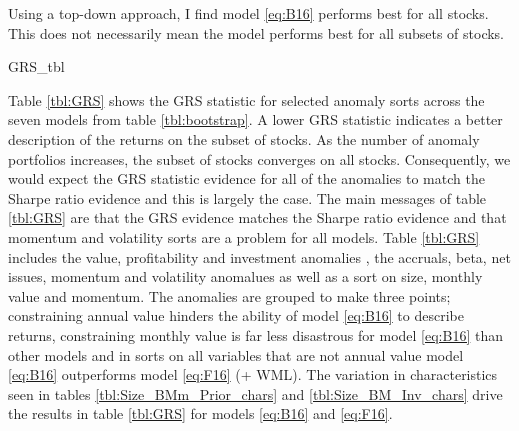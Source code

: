 
Using a top-down approach, I find model \ref{eq:B16} performs best for all
stocks.
This does not necessarily mean the model performs best for all subsets of
stocks.

{GRS_tbl}

Table \ref{tbl:GRS} shows the GRS statistic for selected anomaly sorts across
the seven models from table \ref{tbl:bootstrap}.
A lower GRS statistic indicates a better description of the returns on the
subset of stocks.
As the number of anomaly portfolios increases, the subset of stocks converges
on all stocks.
Consequently, we would expect the GRS statistic evidence for all of the
anomalies to match the Sharpe ratio evidence and this is largely the case.
The main messages of table \ref{tbl:GRS} are that the GRS evidence matches the
Sharpe ratio evidence and that momentum and volatility sorts are a problem for
all models.
Table \ref{tbl:GRS} includes the value, profitability and investment anomalies
\parencite{fama2006profitability, fama2015five},
the accruals, beta, net issues, momentum and volatility anomalues
\parencite{fama2016dissecting} as well as a sort on size, monthly value and
momentum.
The anomalies are grouped to make three points;
constraining annual value hinders the ability of model \ref{eq:B16} to describe
returns,
constraining monthly value is far less disastrous for model \ref{eq:B16}
than other models and
in sorts on all variables that are not annual value
model \ref{eq:B16} outperforms model \ref{eq:F16} (+ WML).
The variation in characteristics seen in tables \ref{tbl:Size_BMm_Prior_chars}
and \ref{tbl:Size_BM_Inv_chars} drive the results in table \ref{tbl:GRS}
for models \ref{eq:B16} and \ref{eq:F16}.

